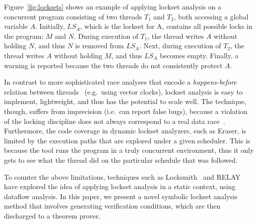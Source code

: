 Figure~\ref{fig:locksets} shows an example of applying lockset analysis on a concurrent program consisting of two threads $T_1$ and $T_2$, both accessing a global variable $A$. Initially, $\mathit{LS}_A$, which is the lockset for A, contains all possible locks in the program: $M$ and $N$. During execution of $T_1$, the thread writes $A$ without holding $N$, and thus $N$ is removed from $\mathit{LS}_A$. Next, during execution of $T_2$, the thread writes $A$ without holding $M$, and thus $\mathit{LS}_A$ becomes empty. Finally, a warning is reported because the two threads do not consistently protect $A$.

In contrast to more sophisticated race analyses that encode a \emph{happens-before} relation between threads~\cite{lamport1978time} (e.g.\ using vector clocks), lockset analysis is easy to implement, lightweight, and thus has the potential to scale well.  The technique, though, suffers from imprecision (i.e.\ can report false bugs), because a violation of the locking discipline does not always correspond to a real data race~\cite{savage1997eraser, pozniansky2003efficient, o2003hybrid, elmas2007goldilocks, flanagan2009fasttrack}. Furthermore, the code coverage in dynamic lockset analyzers, such as Eraser, is limited by the execution paths that are explored under a given scheduler. This is because the tool runs the program in a truly concurrent environment, thus it only gets to see what the thread did on the particular schedule that was followed.

To counter the above limitations, techniques such as Locksmith~\cite{pratikakis2006locksmith} and RELAY~\cite{voung2007relay} have explored the idea of applying lockset analysis in a static context, using dataflow analysis. In this paper, we present a novel symbolic lockset analysis method that involves generating verification conditions, which are then discharged to a theorem prover.
